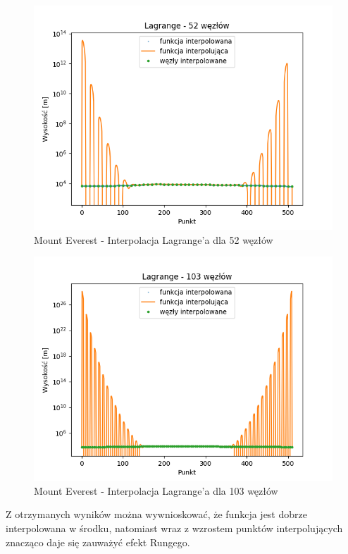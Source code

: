 \documentclass[12pt]{extarticle}
\begin{document}
\begin{figure}[H]
    \centering
    \includegraphics[scale=0.8]{interpolation_MountEverest_Lagrange_52.png}
    \caption{Mount Everest - Interpolacja Lagrange'a dla 52 węzłów}
\end{figure}
\begin{figure}[H]
    \centering
    \includegraphics[scale=0.8]{interpolation_MountEverest_Lagrange_103.png}
    \caption{Mount Everest - Interpolacja Lagrange'a dla 103 węzłów}
\end{figure}
Z otrzymanych wyników można wywnioskować, że funkcja jest dobrze interpolowana w środku, natomiast wraz z wzrostem punktów interpolujących znacząco daje się zauważyć efekt Rungego.
\end{document}
